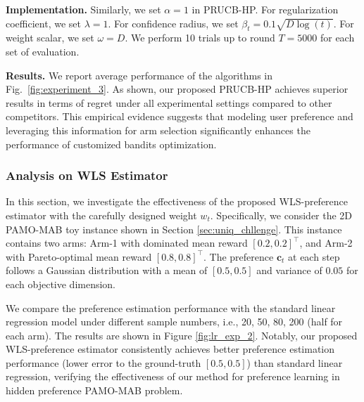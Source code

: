 \textbf{Implementation.}
Similarly, we set $\alpha = 1$ in PRUCB-HP. For regularization coefficient, we set $\lambda = 1$. For confidence radius, we set $\beta_t = 0.1\sqrt{D \log(t)}$. For weight scalar, we set $\omega = D$.
We perform 10 trials up to round $T = 5000$ for each set of evaluation.

\textbf{Results.}
We report average performance of the algorithms in Fig.~\ref{fig:experiment_3}. 
As shown, our proposed PRUCB-HP achieves superior results in terms of regret under all experimental settings compared to other competitors. This empirical evidence suggests that modeling user preference and leveraging this information for arm selection significantly enhances the performance of customized bandits optimization.



\subsubsection{Analysis on WLS Estimator}
In this section, we investigate the effectiveness of the proposed WLS-preference estimator with the carefully designed weight $w_t$. 
Specifically, we consider the 2D PAMO-MAB toy instance shown in Section \ref{sec:uniq_chllenge}. This instance contains two arms: Arm-1 with dominated mean reward $[0.2,0.2]^{\top}$, and Arm-2 with Pareto-optimal mean reward $[0.8,0.8]^{\top}$. The preference $\boldsymbol{c}_t$ at each step follows a Gaussian distribution with a mean of $[0.5, 0.5]$ and variance of $0.05$ for each objective dimension. 

We compare the preference estimation performance with the standard linear regression model under different sample numbers, i.e., 20, 50, 80, 200 (half for each arm).
The results are shown in Figure \ref{fig:lr_exp_2}. Notably, our proposed WLS-preference estimator consistently achieves better preference estimation performance (lower error to the ground-truth $[0.5, 0.5]$) than standard linear regression, verifying the effectiveness of our method for preference learning in hidden preference PAMO-MAB problem.

